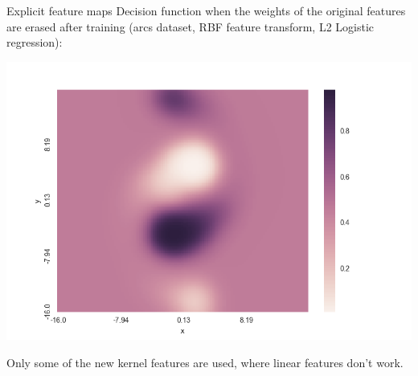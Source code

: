 \documentclass[11pt]{beamer}
\begin{document}
\begin{frame}{Explicit feature maps}
Decision function when the weights of the original features are erased after training (arcs dataset, RBF feature transform, L2 Logistic regression):
\begin{center}
\includegraphics[scale=0.40]{arcs_sparsity.png}
\end{center}
Only some of the new kernel features are used, where linear features don't work.
\end{frame}
\end{document}
